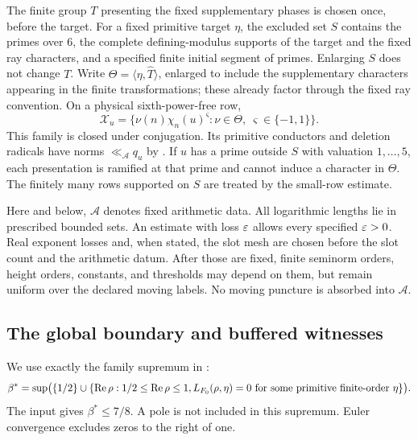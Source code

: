 The finite group $T$ presenting the fixed supplementary phases is chosen once, before the target. For a fixed primitive target $\eta$, the excluded set $S$ contains the primes over $6$, the complete defining-modulus supports of the target and the fixed ray characters, and a specified finite initial segment of primes. Enlarging $S$ does not change $T$. Write $\Theta=\langle\eta,\widehat T\rangle$, enlarged to include the supplementary characters appearing in the finite transformations; these already factor through the fixed ray convention. On a physical sixth-power-free row,
\begin{equation}\label{eq:Xfamily}
 \mathcal X_u=\{\nu(n)\chi_n(u)^\varsigma:\nu\in\Theta,\ \varsigma\in\{-1,1\}\}.
\end{equation}
This family is closed under conjugation. Its primitive conductors and deletion radicals have norms $\ll_{\mathcal A}q_u$ by . If $u$ has a prime outside $S$ with valuation $1,\ldots,5$, each presentation is ramified at that prime and cannot induce a character in $\Theta$. The finitely many rows supported on $S$ are treated by the small-row estimate.

Here and below, $\mathcal A$ denotes fixed arithmetic data. All logarithmic lengths lie in prescribed bounded sets. An estimate with loss $\varepsilon$ allows every specified $\varepsilon>0$. Real exponent losses and, when stated, the slot mesh are chosen before the slot count and the arithmetic datum. After those are fixed, finite seminorm orders, height orders, constants, and thresholds may depend on them, but remain uniform over the declared moving labels. No moving puncture is absorbed into $\mathcal A$.

\subsection{The global boundary and buffered witnesses}
We use exactly the family supremum in :
\begin{equation}\label{eq:betastar}
 \beta^*=\sup\bigl(\{1/2\}\cup\{\operatorname{Re}\rho:1/2\le\operatorname{Re}\rho\le1,
 L_{F_0}(\rho,\eta)=0\text{ for some primitive finite-order }\eta\}\bigr).
\end{equation}
The input  gives $\beta^*\le7/8$. A pole is not included in this supremum. Euler convergence excludes zeros to the right of one.

